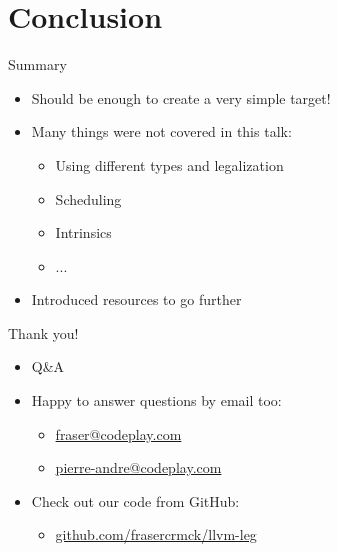 \documentclass[t]{beamer}
\begin{document}
\section{Conclusion}

\begin{frame}{Summary}

\begin{itemize}
    \item Should be enough to create a very simple target!
    \item Many things were not covered in this talk:
    \begin{itemize}
        \item Using different types and legalization
        \item Scheduling
        \item Intrinsics
        \item ...
    \end{itemize}
    \item Introduced resources to go further
\end{itemize}

\end{frame}


\begin{frame}{Thank you!}

\begin{itemize}
    \item Q\&A
    \item Happy to answer questions by email too:
    \begin{itemize}
        \item \url{fraser@codeplay.com}
        \item \url{pierre-andre@codeplay.com}
    \end{itemize}
    \item Check out our code from GitHub:
    \begin{itemize}
        \item \url{github.com/frasercrmck/llvm-leg}
    \end{itemize}
\end{itemize}

\end{frame}

\end{document}
